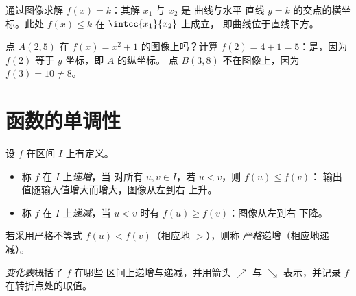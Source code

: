 \begin{omfigure}

{\small 通过图像求解 $f(x) = k$：其解 $x_1$ 与 $x_2$ 是
曲线与水平
直线 $y = k$ 的交点的横坐标。此处 $f(x) \leq k$ 在 $\intcc{x_1}{x_2}$ 上成立，
即曲线位于直线下方。}
\end{omfigure}

\begin{example}\label{ex:g10:functions:membership}
点 $A(2, 5)$ 在 $f(x) = x^2 + 1$ 的图像上吗？计算
$f(2) = 4 + 1 = 5$：是，因为 $f(2)$ 等于 $y$ 坐标，即 $A$ 的纵坐标。
点 $B(3, 8)$ 不在图像上，因为 $f(3) = 10 \neq 8$。
\end{example}

\section{函数的单调性}

\begin{definition}[递增、递减]\label{def:g10:functions:variations}
设 $f$ 在区间 $I$ 上有定义。
\begin{itemize}
  \item 称 $f$ 在 $I$ 上\emph{递增}，当
        对所有 $u, v \in I$，若 $u < v$，则 $f(u) \leq f(v)$：
        输出值随输入值增大而增大，图像从左到右
        上升。
  \item 称 $f$ 在 $I$ 上\emph{递减}，当
        $u < v$ 时有 $f(u) \geq f(v)$：图像从左到右
        下降。
\end{itemize}
若采用严格不等式 $f(u) < f(v)$（相应地 $>$），则称
\emph{严格}递增（相应地递减）。
\end{definition}

\begin{definition}[变化表]\label{def:g10:functions:table}
\emph{变化表}概括了 $f$ 在哪些
区间上递增与递减，并用箭头 $\nearrow$ 与
$\searrow$ 表示，并记录 $f$ 在转折点处的取值。
\end{definition}


